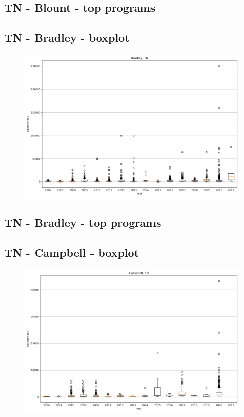 \subsection*{TN - Blount - top programs}

\newpage
\subsection*{TN - Bradley - boxplot}
\begin{figure}[h]
\centering
\includegraphics[width=7in]{../output/boxplots/counties/Bradley-TN_boxplot.png}
\end{figure}


\subsection*{TN - Bradley - top programs}

\newpage
\subsection*{TN - Campbell - boxplot}
\begin{figure}[h]
\centering
\includegraphics[width=7in]{../output/boxplots/counties/Campbell-TN_boxplot.png}
\end{figure}


